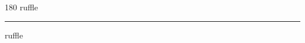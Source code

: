 
\begin{frame}
\begin{center}
\begin{turn}{180}
{\fontsize{2.5cm}{1em}\selectfont ruffle}
\end{turn}
\vspace{1em}\par  
\hrule
\vspace{1em}\par  
{\fontsize{2.5cm}{1em}\selectfont ruffle}
\end{center}
\end{frame}
